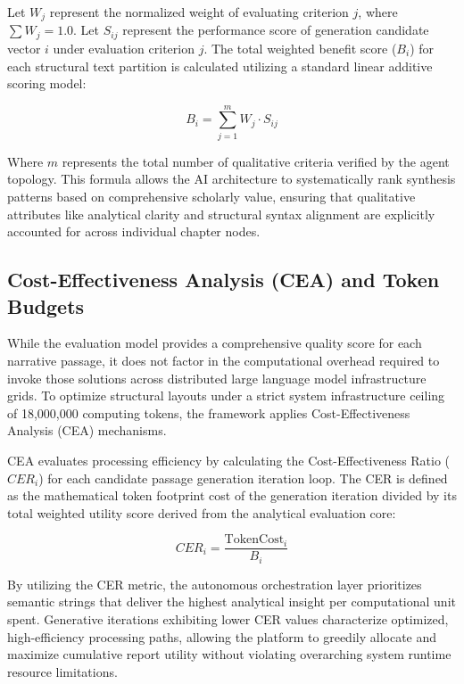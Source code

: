 Let \(W_{j}\) represent the normalized weight of evaluating criterion \(j\), where \(\sum W_{j} = 1.0\). Let \(S_{ij}\) represent the performance score of generation candidate vector \(i\) under evaluation criterion \(j\). The total weighted benefit score (\(B_{i}\)) for each structural text partition is calculated utilizing a standard linear additive scoring model:

\begin{equation}
B_{i} = \sum_{j=1}^{m} W_{j} \cdot S_{ij}
\end{equation}

Where \(m\) represents the total number of qualitative criteria verified by the agent topology. This formula allows the AI architecture to systematically rank synthesis patterns based on comprehensive scholarly value, ensuring that qualitative attributes like analytical clarity and structural syntax alignment are explicitly accounted for across individual chapter nodes.

\subsection{Cost-Effectiveness Analysis (CEA) and Token Budgets}
While the evaluation model provides a comprehensive quality score for each narrative passage, it does not factor in the computational overhead required to invoke those solutions across distributed large language model infrastructure grids. To optimize structural layouts under a strict system infrastructure ceiling of 18,000,000 computing tokens, the framework applies Cost-Effectiveness Analysis (CEA) mechanisms. 

CEA evaluates processing efficiency by calculating the Cost-Effectiveness Ratio (\(CER_i\)) for each candidate passage generation iteration loop. The CER is defined as the mathematical token footprint cost of the generation iteration divided by its total weighted utility score derived from the analytical evaluation core:

\begin{equation}
CER_i = \frac{\text{TokenCost}_i}{B_i}
\end{equation}

By utilizing the CER metric, the autonomous orchestration layer prioritizes semantic strings that deliver the highest analytical insight per computational unit spent. Generative iterations exhibiting lower CER values characterize optimized, high-efficiency processing paths, allowing the platform to greedily allocate and maximize cumulative report utility without violating overarching system runtime resource limitations.

